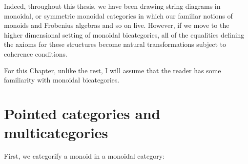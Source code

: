 Indeed, throughout this thesis, we have been drawing string diagrams in monoidal, or symmetric monoidal categories in which our familiar notions of monoids and Frobenius algebras and so on live.  However, if we move to the higher dimensional setting of monoidal bicategories, all of the equalities defining the axioms for these structures become natural transformations subject to  coherence conditions.   


For this Chapter, unlike the rest, I will assume that the reader has some familiarity with monoidal bicategories.


\section{Pointed categories and multicategories}
 First, we categorify a monoid in a monoidal category:

